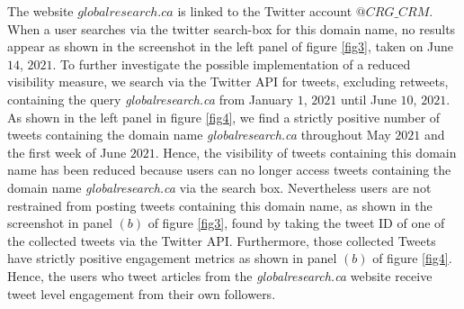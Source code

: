 \documentclass{article}
\begin{document}
\smallskip

The website $globalresearch.ca$ is linked to the Twitter account {$@CRG\_CRM$}. When a user searches via the twitter search-box for this domain name, no results appear as shown in the screenshot in the left panel of figure \ref{fig3}, taken on June $14$, $2021$. To further investigate the possible implementation of a reduced visibility measure, we search via the Twitter API for tweets, excluding retweets, containing the query {\it globalresearch.ca} from January $1$, $2021$ until June $10$, $2021$.  As shown in the left panel in figure \ref{fig4}, we find a strictly positive number of tweets containing the domain name {\it globalresearch.ca} throughout May $2021$ and the first week of June $2021$. Hence, the visibility of tweets containing this domain name has been reduced because users can no longer access tweets containing the domain name {\it globalresearch.ca} via the search box. Nevertheless users are not restrained from posting tweets containing this domain name, as shown in the screenshot in panel $(b)$ of figure \ref{fig3}, found by taking the tweet ID of one of the collected tweets via the Twitter API. Furthermore, those collected Tweets have strictly positive engagement metrics as shown in panel $(b)$ of figure \ref{fig4}. Hence, the users who tweet articles from the {\it globalresearch.ca} website receive tweet level engagement from their own followers. 
\end{document}
